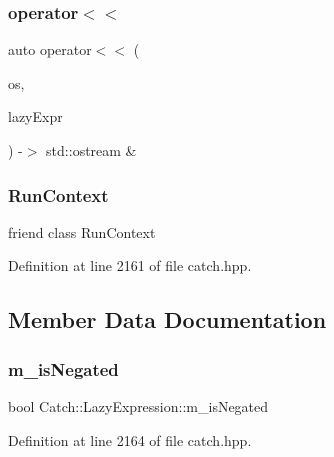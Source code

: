 \mbox{\label{class_catch_1_1_lazy_expression_aa01086581cab2fcd2d4580b8fa787dfc}} 
\subsubsection{operator$<$$<$}
{\footnotesize\ttfamily auto operator$<$$<$ (\begin{DoxyParamCaption}\item[{std\+::ostream \&}]{os,  }\item[{\textbf{ Lazy\+Expression} const \&}]{lazy\+Expr }\end{DoxyParamCaption}) -\/$>$  std\+::ostream \&\hspace{0.3cm}{\ttfamily [friend]}}

\mbox{\label{class_catch_1_1_lazy_expression_af3aa096bb29a772bc534830f29a2ce7a}} 
\subsubsection{RunContext}
{\footnotesize\ttfamily friend class Run\+Context\hspace{0.3cm}{\ttfamily [friend]}}



Definition at line 2161 of file catch.\+hpp.



\subsection{Member Data Documentation}
\mbox{\label{class_catch_1_1_lazy_expression_a975fdfe2bb139512024bb479d478425e}} 
\subsubsection{m\_isNegated}
{\footnotesize\ttfamily bool Catch\+::\+Lazy\+Expression\+::m\+\_\+is\+Negated\hspace{0.3cm}{\ttfamily [private]}}



Definition at line 2164 of file catch.\+hpp.

